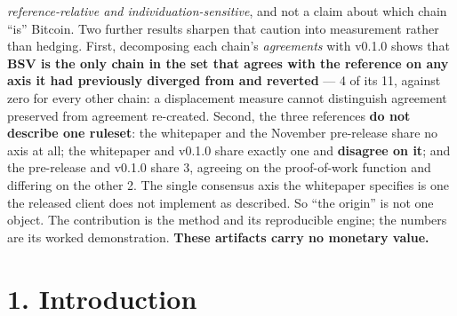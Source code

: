 \documentclass[
]{article}
\begin{document}
\emph{reference-relative and individuation-sensitive}, and not a claim
about which chain ``is'' Bitcoin. Two further results sharpen that
caution into measurement rather than hedging. First, decomposing each
chain's \emph{agreements} with v0.1.0 shows that \textbf{BSV is the only
chain in the set that agrees with the reference on any axis it had
previously diverged from and reverted} --- 4 of its 11, against zero for
every other chain: a displacement measure cannot distinguish agreement
preserved from agreement re-created. Second, the three references
\textbf{do not describe one ruleset}: the whitepaper and the November
pre-release share no axis at all; the whitepaper and v0.1.0 share
exactly one and \textbf{disagree on it}; and the pre-release and v0.1.0
share 3, agreeing on the proof-of-work function and differing on the
other 2. The single consensus axis the whitepaper specifies is one the
released client does not implement as described. So ``the origin'' is
not one object. The contribution is the method and its reproducible
engine; the numbers are its worked demonstration. \textbf{These
artifacts carry no monetary value.}

\section{1. Introduction}\label{introduction}
\end{document}
